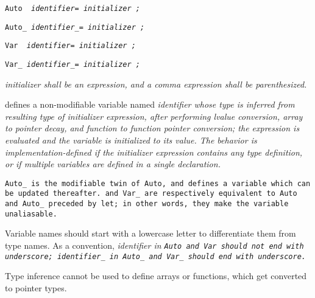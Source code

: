 
\tt {Auto\ } \it{identifier}\s\s\tt{=} \it{initializer} \tt{;}

\tt {Auto\_} \it{identifier}\_\s\tt{=} \it{initializer} \tt{;}

\s\tt{Var\ } \it{identifier}\s\s\tt{=} \it{initializer} \tt{;}

\s\tt{Var\_} \it{identifier}\_\s\tt{=} \it{initializer} \tt{;}


\it{initializer} shall be an expression,
and a comma expression shall be parenthesized.


 defines a non-modifiable variable named \it{identifier} whose
type is inferred from resulting type of \it{initializer} expression,
after performing lvalue conversion, array to pointer decay,
and function to function pointer conversion;
the expression is evaluated and the variable is initialized to its value.
The behavior is implementation-defined if the
\it{initializer} expression contains any type definition,
or if multiple variables are defined in a single declaration.

\tt{Auto_} is the modifiable twin of \tt{Auto},
and defines a variable which can be updated thereafter.
 and \tt{Var_} are respectively equivalent
to \tt{Auto} and \tt{Auto_} preceded by \tt{let};
in other words, they make the variable unaliasable.


Variable names should start with a lowercase
letter to differentiate them from type names.
As a convention,
\it{identifier} in \tt{Auto} and \tt{Var} should not end with underscore;
\it{identifier\_} in \tt{Auto_} and \tt{Var_} should end with underscore.

\note Type inference cannot be used to define arrays or functions,
which get converted to pointer types.
